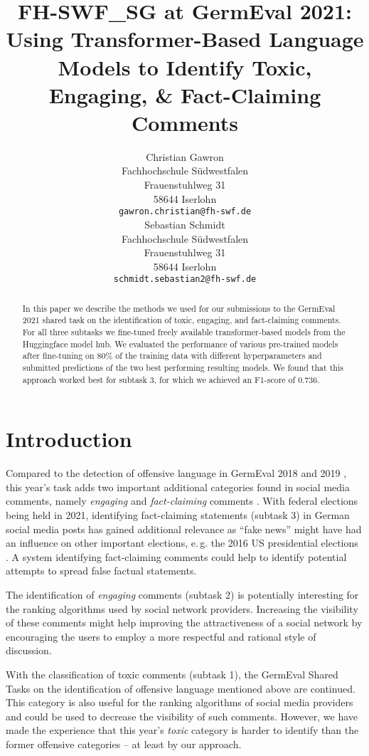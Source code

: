 \documentclass[11pt,a4paper]{article}
\title{FH-SWF\_SG at GermEval 2021: Using Transformer-Based Language Models to Identify Toxic, Engaging, \& Fact-Claiming Comments}
\author{Christian Gawron \\
  Fachhochschule S\"udwestfalen \\
  Frauenstuhlweg 31 \\
  58644 Iserlohn \\
  \texttt{gawron.christian@fh-swf.de} \\\And
  Sebastian Schmidt \\
  Fachhochschule S\"udwestfalen \\
  Frauenstuhlweg 31 \\
  58644 Iserlohn \\
  \texttt{schmidt.sebastian2@fh-swf.de} \\}
\date{}
\begin{document}
\maketitle
\begin{abstract}
    In this paper we describe the methods we used for our submissions to the 
    GermEval 2021 shared task on the identification of toxic, engaging, and fact-claiming comments.
    For all three subtasks we fine-tuned freely available transformer-based models from the 
    Huggingface model hub. We evaluated the performance of various pre-trained models 
    after fine-tuning on 80\% of the training data
    with different hyperparameters and submitted predictions of the two best performing resulting models.
    We found that this approach worked best for subtask 3, for which we achieved an F1-score of $0.736$. 
\end{abstract}




\section{Introduction}
Compared to the detection of offensive language in GermEval 2018 \cite{GermEval2018} and 2019 \cite{GermEval2019}, 
this year's task adds two important additional categories found in social media comments, namely \emph{engaging} and 
\emph{fact-claiming} comments \cite{germeval2021overview}. With federal elections being held in 2021, identifying 
fact-claiming statements (subtask 3) in German social media posts has gained additional relevance as ``fake news'' might have 
had an influence on other important elections, e.\,g. the 2016 US presidential elections \cite{10.1257/jep.31.2.211, Bovet2019}.
A system identifying fact-claiming comments could help to identify potential attempts to spread false factual statements. 

The identification of \emph{engaging} comments (subtask 2) is potentially interesting for the 
ranking algorithms used by social network providers. 
Increasing the visibility of these comments might help improving the attractiveness of a social network 
by encouraging the users to employ a more respectful and rational style of discussion.

With the classification of toxic comments (subtask 1), the GermEval Shared Tasks on the identification of 
offensive language mentioned above are continued. This category is also useful for the ranking algorithms
of social media providers and could be used to decrease the visibility of such comments.
However, we have made the experience that this year's \emph{toxic} category is harder to identify than the former 
offensive categories -- at least by our approach. 
\end{document}
